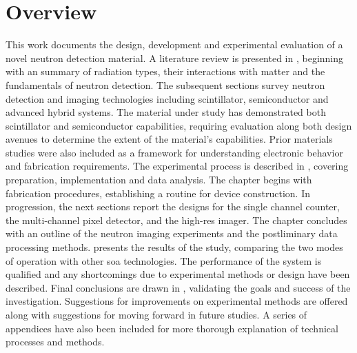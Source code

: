 \documentclass[../../main.tex]{subfiles}
\begin{document}
%
    \section{Overview}%
    \label{sec:chapter-1:overview}%
    This work documents the design, development and experimental evaluation of a novel neutron detection material.
    A literature review is presented in , beginning with an summary of radiation types, their interactions with matter and the fundamentals of neutron detection.
    The subsequent sections survey neutron detection and imaging technologies including scintillator, semiconductor and advanced hybrid systems.
    The material under study has demonstrated both scintillator and semiconductor capabilities, requiring evaluation along both design avenues to determine the extent of the material's capabilities. 
    Prior materials studies were also included as a framework for understanding electronic behavior and fabrication requirements.
    The experimental process is described in , covering preparation, implementation and data analysis.
    The chapter begins with fabrication procedures, establishing a routine for device construction.
    In progression, the next sections report the designs for the single channel counter, the multi-channel pixel detector, and the \gls{high-res} imager.
    The chapter concludes with an outline of the neutron imaging experiments and the postliminary data processing methods.
     presents the results of the study, comparing the two modes of operation with other \gls{soa} technologies.
    The performance of the system is qualified and any shortcomings due to experimental methods or design have been described.
    Final conclusions are drawn in , validating the goals and success of the investigation.
    Suggestions for improvements on experimental methods are offered along with suggestions for moving forward in future studies.
    A series of appendices have also been included for more thorough explanation of technical processes and methods.
\end{document}
